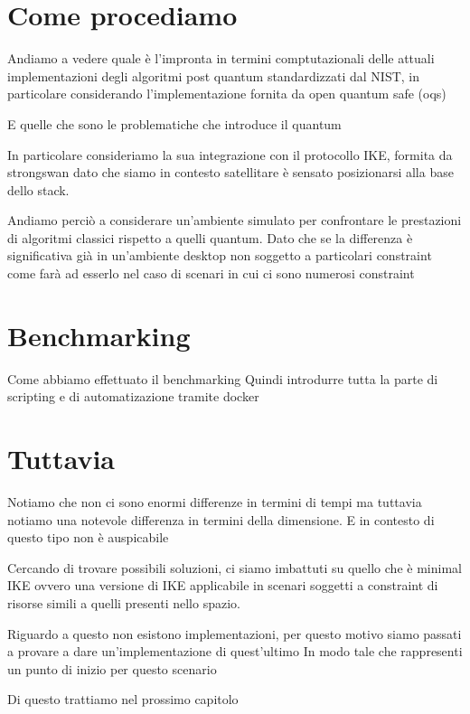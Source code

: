 \section{Come procediamo}

Andiamo a vedere quale è l'impronta in termini comptutazionali delle attuali implementazioni degli algoritmi 
post quantum standardizzati dal NIST, in particolare considerando l'implementazione fornita da open quantum safe (oqs)

E quelle che sono le problematiche che introduce il quantum

In particolare consideriamo la sua integrazione con il protocollo IKE, formita da strongswan dato che siamo in contesto 
satellitare è sensato posizionarsi alla base dello stack.

Andiamo perciò a considerare un'ambiente simulato per confrontare le prestazioni di algoritmi classici rispetto a quelli quantum.
Dato che se la differenza è significativa già in un'ambiente desktop non soggetto a particolari constraint come 
farà ad esserlo nel caso di scenari in cui ci sono numerosi constraint


\section{Benchmarking}
Come abbiamo effettuato il benchmarking
Quindi introdurre tutta la parte di scripting e di automatizazione tramite docker

\section{Tuttavia}

Notiamo che non ci sono enormi differenze in termini di tempi ma tuttavia notiamo una notevole differenza
in termini della dimensione. E in contesto di questo tipo non è auspicabile

Cercando di trovare possibili soluzioni, ci siamo imbattuti su quello che è minimal IKE ovvero
una versione di IKE applicabile in scenari soggetti a constraint di risorse simili a quelli presenti nello spazio.

Riguardo a questo non esistono implementazioni, per questo motivo siamo passati a provare a dare un'implementazione di quest'ultimo
In modo tale che rappresenti un punto di inizio per questo scenario

Di questo trattiamo nel prossimo capitolo



